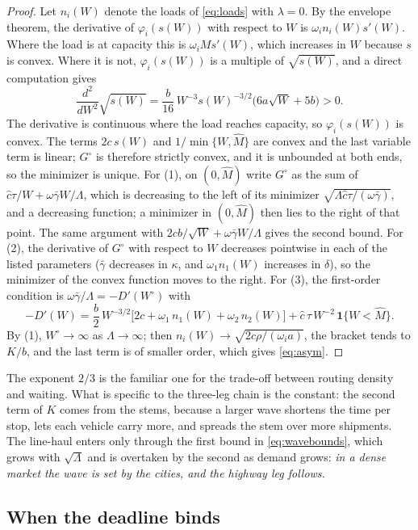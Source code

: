 \documentclass[10pt, reqno]{amsart}
\theoremstyle{definition}
\begin{document}
\begin{proof}
Let $n_i(W)$ denote the loads of \eqref{eq:loads} with $\lambda=0$. By the envelope theorem, the derivative of $\varphi_i(s(W))$ with respect to $W$ is $\omega_i n_i(W)s'(W)$. Where the load is at capacity this is $\omega_iMs'(W)$, which increases in $W$ because $s$ is convex. Where it is not, $\varphi_i(s(W))$ is a multiple of $\sqrt{s(W)}$, and a direct computation gives
\[
\frac{d^2}{dW^2}\sqrt{s(W)}=\frac{b}{16}\,W^{-3}s(W)^{-3/2}\big(6a\sqrt W+5b\big)>0 .
\]
The derivative is continuous where the load reaches capacity, so $\varphi_i(s(W))$ is convex. The terms $2c\,s(W)$ and $1/\min\{W,\hat M\}$ are convex and the last variable term is linear; $G^\circ$ is therefore strictly convex, and it is unbounded at both ends, so the minimizer is unique. For (1), on $(0,\hat M)$ write $G^\circ$ as the sum of $\hat c\tau/W+\omega\bar\gamma W/\Lambda$, which is decreasing to the left of its minimizer $\sqrt{\Lambda\hat c\tau/(\omega\bar\gamma)}$, and a decreasing function; a minimizer in $(0,\hat M)$ then lies to the right of that point. The same argument with $2cb/\sqrt W+\omega\bar\gamma W/\Lambda$ gives the second bound. For (2), the derivative of $G^\circ$ with respect to $W$ decreases pointwise in each of the listed parameters ($\bar\gamma$ decreases in $\kappa$, and $\omega_1n_1(W)$ increases in $\delta$), so the minimizer of the convex function moves to the right. For (3), the first-order condition is $\omega\bar\gamma/\Lambda=-D'(W^\circ)$ with
\[
-D'(W)=\frac b2\,W^{-3/2}\Big[2c+\omega_1\,n_1(W)+\omega_2\,n_2(W)\Big]+\hat c\,\tau\,W^{-2}\,\mathbf 1\{W<\hat M\}.
\]
By (1), $W^\circ\to\infty$ as $\Lambda\to\infty$; then $n_i(W)\to\sqrt{2c\rho/(\omega_i a)}$, the bracket tends to $K/b$, and the last term is of smaller order, which gives \eqref{eq:asym}.
\end{proof}

The exponent $2/3$ is the familiar one for the trade-off between routing density and waiting. What is specific to the three-leg chain is the constant: the second term of $K$ comes from the stems, because a larger wave shortens the time per stop, lets each vehicle carry more, and spreads the stem over more shipments. The line-haul enters only through the first bound in \eqref{eq:wavebounds}, which grows with $\sqrt\Lambda$ and is overtaken by the second as demand grows: \emph{in a dense market the wave is set by the cities, and the highway leg follows.}

\subsection{When the deadline binds}
\end{document}
